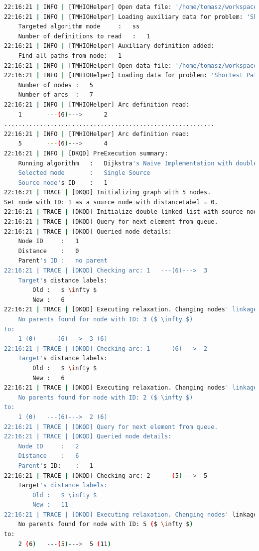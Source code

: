\tiny
\begin{lstlisting}[mathescape,language=bash]
22:16:21 | INFO | [TMHIOHelper] Open data file: '/home/tomasz/workspace/TMH_Tests/ss/test.ss'.
22:16:21 | INFO | [TMHIOHelper] Loading auxiliary data for problem: 'Shortest Path Problem':
	Targeted algorithm mode		:	ss
	Number of definitions to read	:	1
22:16:21 | INFO | [TMHIOHelper] Auxiliary definition added:
	Find all paths from node:	1
22:16:21 | INFO | [TMHIOHelper] Open data file: '/home/tomasz/workspace/TMH_Tests/gr/testTMH1.gr'.
22:16:21 | INFO | [TMHIOHelper] Loading data for problem: 'Shortest Path Problem':
	Number of nodes	:	5
	Number of arcs	:	7
22:16:21 | INFO | [TMHIOHelper] Arc definition read:
	1		---(6)--->		2
...........................................................
22:16:21 | INFO | [TMHIOHelper] Arc definition read:
	5		---(6)--->		4
22:16:21 | INFO | [DKQD] PreExecution summary:
	Running algorithm	:	Dijkstra's Naive Implementation with double-linked lists
	Selected mode		:	Single Source
	Source node's ID	:	1
22:16:21 | TRACE | [DKQD] Initializing graph with 5 nodes.
Set node with ID: 1 as a source node with distanceLabel = 0.
22:16:21 | TRACE | [DKQD] Initialize double-linked list with source node with ID: 1 (distance: 0).
22:16:21 | TRACE | [DKQD] Query for next element from queue.
22:16:21 | TRACE | [DKQD] Queried node details:
	Node ID		:	1
	Distance	:	0
	Parent's ID	:	no parent
22:16:21 | TRACE | [DKQD] Checking arc:	1	---(6)--->	3
	Target's distance labels:
		Old	:	$ \infty $
		New	:	6
22:16:21 | TRACE | [DKQD] Executing relaxation. Changing nodes' linkage from:
	No parents found for node with ID: 3 ($ \infty $)
to:
	1 (0)	---(6)--->	3 (6)
22:16:21 | TRACE | [DKQD] Checking arc:	1	---(6)--->	2
	Target's distance labels:
		Old	:	$ \infty $
		New	:	6
22:16:21 | TRACE | [DKQD] Executing relaxation. Changing nodes' linkage from:
	No parents found for node with ID: 2 ($ \infty $)
to:
	1 (0)	---(6)--->	2 (6)
22:16:21 | TRACE | [DKQD] Query for next element from queue.
22:16:21 | TRACE | [DKQD] Queried node details:
	Node ID		:	2
	Distance	:	6
	Parent's ID:	:	1
22:16:21 | TRACE | [DKQD] Checking arc:	2	---(5)--->	5
	Target's distance labels:
		Old	:	$ \infty $
		New	:	11
22:16:21 | TRACE | [DKQD] Executing relaxation. Changing nodes' linkage from:
	No parents found for node with ID: 5 ($ \infty $)
to:
	2 (6)	---(5)--->	5 (11)


\end{lstlisting}
